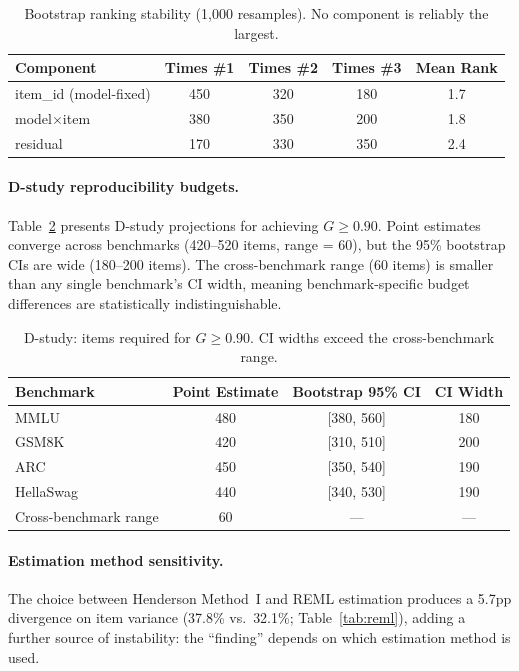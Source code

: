 \documentclass[11pt]{article}
\begin{document}
\begin{table}[t]
\centering
\caption{Bootstrap ranking stability (1{,}000 resamples). No component is reliably the largest.}
\label{tab:bootstrap_rank}
\begin{tabular}{lcccc}
\toprule
Component & Times \#1 & Times \#2 & Times \#3 & Mean Rank \\
\midrule
item\_id (model-fixed)   & 450 & 320 & 180 & 1.7 \\
model$\times$item        & 380 & 350 & 200 & 1.8 \\
residual                  & 170 & 330 & 350 & 2.4 \\
\bottomrule
\end{tabular}
\end{table}

\paragraph{D-study reproducibility budgets.}
Table~\ref{tab:dstudy} presents D-study projections for achieving $G \geq 0.90$.
Point estimates converge across benchmarks (420--520 items, range = 60), but the 95\% bootstrap CIs are wide (180--200 items).
The cross-benchmark range (60 items) is smaller than any single benchmark's CI width, meaning benchmark-specific budget differences are statistically indistinguishable.

\begin{table}[t]
\centering
\caption{D-study: items required for $G \geq 0.90$. CI widths exceed the cross-benchmark range.}
\label{tab:dstudy}
\begin{tabular}{lccc}
\toprule
Benchmark & Point Estimate & Bootstrap 95\% CI & CI Width \\
\midrule
MMLU      & 480 & [380, 560] & 180 \\
GSM8K     & 420 & [310, 510] & 200 \\
ARC       & 450 & [350, 540] & 190 \\
HellaSwag & 440 & [340, 530] & 190 \\
\midrule
Cross-benchmark range & 60 & --- & --- \\
\bottomrule
\end{tabular}
\end{table}

\paragraph{Estimation method sensitivity.}
The choice between Henderson Method~I and REML estimation produces a 5.7pp divergence on item variance (37.8\% vs.\ 32.1\%; Table~\ref{tab:reml}), adding a further source of instability: the ``finding'' depends on which estimation method is used.
\end{document}
